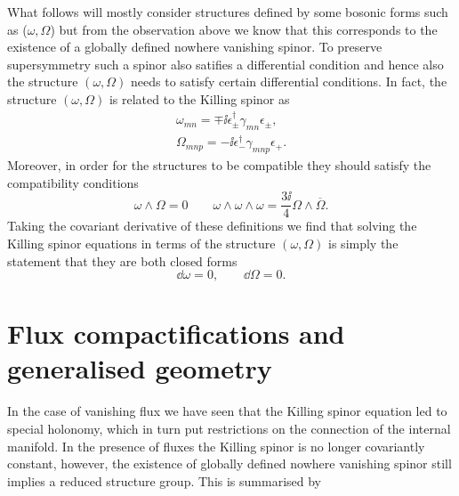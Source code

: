 What follows will mostly consider structures defined by some bosonic forms such as ($\omega,\Omega$) but from the observation above we know that this corresponds to the existence of a globally defined nowhere vanishing spinor. To preserve supersymmetry such a spinor also satifies a differential condition and hence also the structure $(\omega,\Omega)$ needs to satisfy certain differential conditions. In fact, the structure $(\omega,\Omega)$ is related to the Killing spinor as
\begin{align}
    \omega_{mn} = \mp\ii \epsilon^\dagger_\pm\gamma_{mn}\epsilon_\pm,\\
    \Omega_{mnp} = -\ii\epsilon^\dagger_-\gamma_{mnp}\epsilon_+.
\end{align}
Moreover, in order for the structures to be compatible they should satisfy the compatibility conditions 
\begin{equation}\label{eq:CompatibilityCalabiYau}
    \omega\wedge\Omega = 0\qquad \omega\wedge\omega\wedge\omega = \frac{3\ii}{4}\Omega\wedge\overbar{\Omega}.
\end{equation}
Taking the covariant derivative of these definitions we find that solving the Killing spinor equations in terms of the structure $(\omega,\Omega)$ is simply the statement that they are both closed forms 
\begin{equation}
    \dd \omega = 0, \qquad \dd \Omega = 0.
\end{equation}

\section{Flux compactifications and generalised geometry}
In the case of vanishing flux we have seen that the Killing spinor equation led to special holonomy, which in turn put restrictions on the connection of the internal manifold. In the presence of fluxes the Killing spinor is no longer covariantly constant, however, the existence of globally defined nowhere vanishing spinor still implies a reduced structure group. This is summarised by 


